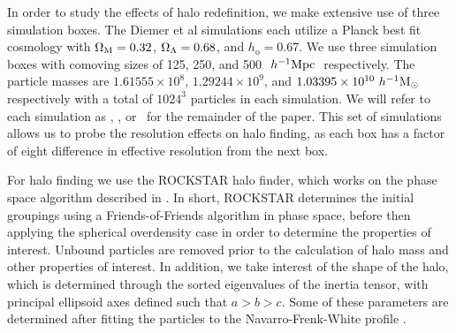 \documentclass[usenatbib,usegraphicx,letterpaper]{mn2e}
\begin{document}
In order to study the effects of halo redefinition, we make extensive use of three simulation boxes. The Diemer et al simulations each utilize a Planck best fit cosmology with $\Omega_{\mathrm{M}} = 0.32$, $\Omega_{\Lambda} = 0.68$, and $h_{\mathrm{o}} = 0.67$. We use three simulation boxes with comoving sizes of 125, 250, and 500 $\ h^{-1}\mathrm{Mpc}~$ respectively. The particle masses are $1.61555 \times 10^8$, $1.29244 \times 10^9$, and $1.03395 \times 10^{10} \ h^{-1}\mathrm{M}_{\odot}~$ respectively with a total of $1024^3$ particles in each simulation. We will refer to each simulation as \simA, \simB, or \simC  \ for the remainder of the paper. This set of simulations allows us to probe the resolution effects on halo finding, as each box has a factor of eight difference in effective resolution from the next box. 

For halo finding we use the ROCKSTAR halo finder, which works on the phase space algorithm described in \citet*{behroozi13}. In short, ROCKSTAR determines the initial groupings using a Friends-of-Friends algorithm in phase space, before then applying the spherical overdensity case in order to determine the properties of interest. Unbound particles are removed prior to the calculation of halo mass and other properties of interest. In addition, we take interest of the shape of the halo, which is determined through the sorted eigenvalues of the inertia tensor, with principal ellipsoid axes defined such that $a >b > c$. Some of these parameters are determined after fitting the particles to the Navarro-Frenk-White profile \citep*{nfw97}.
\end{document}
